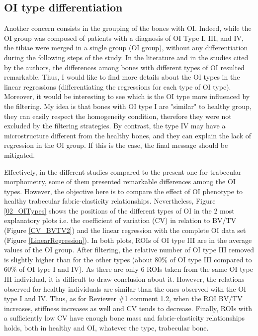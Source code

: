 \documentclass{AR2RC}
\begin{document}
\newpage
\subsection{OI type differentiation}

\RC Another concern consists in the grouping of the bones with OI. Indeed, while the OI group was composed of patients with a diagnosis of OI Type I, III, and IV, the tibiae were merged in a single group (OI group), without any differentiation during the following steps of the study. In the literature and in the studies cited by the authors, the differences among bones with different types of OI resulted remarkable. Thus, I would like to find more details about the OI types in the linear regressions (differentiating the regressions for each type of OI type). Moreover, it would be interesting to see which is the OI type more influenced by the filtering. My idea is that bones with OI type I are "similar" to healthy group, they can easily respect the homogeneity condition, therefore they were not excluded by the filtering strategies. By contrast, the type IV may have a microstructure different from the healthy bones, and they can explain the lack of regression in the OI group. If this is the case, the final message should be mitigated.

\AR Effectively, in the different studies compared to the present one for trabecular morphometry, some of them presented remarkable differences among the OI types. However, the objective here is to compare the effect of OI phenotype to healthy trabecular fabric-elasticity relationships. Nevertheless, Figure \ref{02_OITypes} shows the positions of the different types of OI in the 2 most explanatory plots i.e. the coefficient of variation (CV) in relation to BV/TV (Figure \ref{CV_BVTV2}) and the linear regression with the complete OI data set (Figure \ref{LinearRegression}). In both plots, ROIs of OI type III are in the average values of the OI group. After filtering, the relative number of OI type III removed is slightly higher than for the other types (about 80\% of OI type III compared to 60\% of OI type I and IV). As there are only 6 ROIs taken from the same OI type III individual, it is difficult to draw conclusion about it. However, the relations observed for healthy individuals are similar than the ones observed with the OI type I and IV. Thus, as for Reviewer \#1 comment 1.2, when the ROI BV/TV increases, stiffness increases as well and CV tends to decrease. Finally, ROIs with a sufficiently low CV have enough bone mass and fabric-elasticity relationships holds, both in healthy and OI, whatever the type, trabecular bone.
\end{document}

